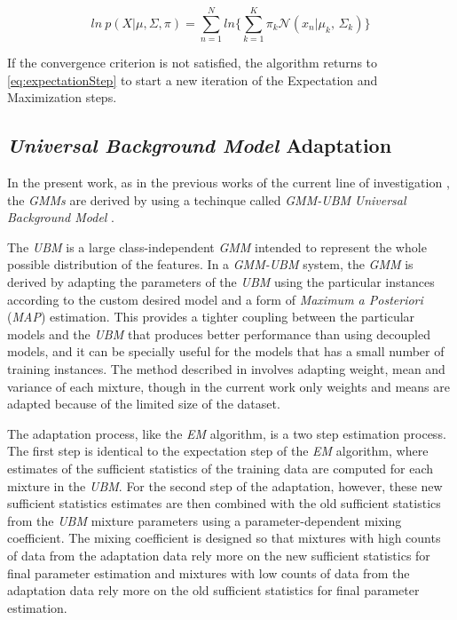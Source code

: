 \begin{equation}
	ln \ p(X|\mu, \Sigma, \pi) = \sum_{n=1}^{N}ln\Big\{\sum_{k=1}^{K}\pi_{k}\mathcal{N}(x_{n}|\mu_{k},\,\Sigma_{k})\Big\}
\end{equation}


If the convergence criterion is not satisfied, the algorithm returns to \ref{eq:expectationStep}
to start a new iteration of the Expectation and Maximization steps.

\subsection{\textit{Universal Background Model} Adaptation}

In the present work, as in the previous works of the current line of investigation
\cite{detection_phone_level_mispronunciation_learning, main}, the \textit{GMMs} are derived
by using a techinque called \textit{GMM-UBM} \textit{Universal Background Model} \cite{ubm_adaptation}.

The \textit{UBM} is a large class-independent \textit{GMM} intended to represent the whole possible
distribution of the features. In a \textit{GMM-UBM} system, the
\textit{GMM} is derived by adapting the parameters of the \textit{UBM} using the particular
instances according to the custom desired model and a form of
\textit{Maximum a Posteriori} (\textit{MAP}) estimation. This provides a tighter coupling
between the particular models and the \textit{UBM} that produces better performance than
using decoupled models, and it can be specially useful for the models that has a small number
of training instances. The method described in \cite{ubm_adaptation} involves adapting weight,
mean and variance of each mixture, though in the current work only weights and means are adapted
because of the limited size of the dataset.

The adaptation process, like the \textit{EM} algorithm, is a two step estimation process.
The first step is identical to the expectation step of the \textit{EM} algorithm, where estimates
of the sufficient statistics of the training data are computed for each mixture in the
\textit{UBM}. For the second step of the adaptation, however, these new sufficient statistics
estimates are then combined with the old sufficient statistics from the \textit{UBM}
mixture parameters using a parameter-dependent mixing coefficient. The
mixing coefficient is designed so that mixtures with high counts of data
from the adaptation data rely more on the new
sufficient statistics for final parameter estimation and mixtures with low counts of data
from the adaptation data rely more on the old sufficient statistics for final parameter
estimation.

